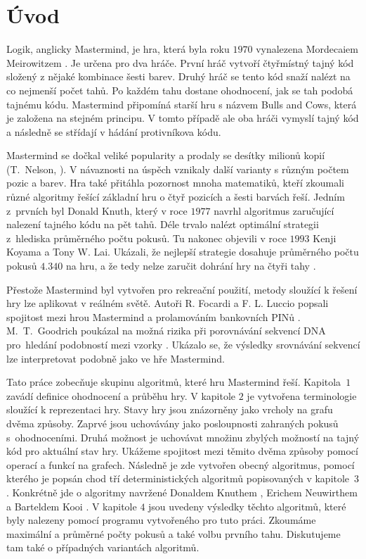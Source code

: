 \chapter*{Úvod}

Logik, anglicky Mastermind, je hra, která byla roku $1970$ vynalezena Mordecaiem Meirowitzem \cite{Nelson-history}. Je určena pro dva hráče. První hráč vytvoří čtyřmístný tajný kód složený z nějaké kombinace šesti barev. Druhý hráč se tento kód snaží nalézt na co nejmenší počet tahů. Po každém tahu dostane ohodnocení, jak se tah podobá tajnému kódu. Mastermind připomíná starší hru s názvem Bulls and Cows, která je založena na stejném principu. V tomto případě ale oba hráči vymyslí tajný kód a následně se střídají v hádání protivníkova kódu. 

Mastermind se dočkal veliké popularity a prodaly se desítky milionů kopií (T.~Nelson, \cite{Nelson-history}). V návaznosti na úspěch vznikaly další varianty s různým počtem pozic a barev. Hra také přitáhla pozornost mnoha matematiků, kteří zkoumali různé algoritmy řešící základní hru o čtyř pozicích a šesti barvách řeší. Jedním z~prvních byl Donald Knuth, který v roce $1977$ navrhl algoritmus zaručující nalezení tajného kódu na pět tahů\cite{donald_e__knuth_1977}. Déle trvalo nalézt optimální strategii z~hlediska průměrného počtu pokusů. Tu nakonec objevili v roce $1993$ Kenji Koyama a Tony W. Lai. Ukázali, že nejlepší strategie dosahuje průměrného počtu pokusů $4.340$ na hru, a že tedy nelze zaručit dohrání hry na čtyři tahy \cite{koyama}. 

Přestože Mastermind byl vytvořen pro rekreační použití, metody sloužící k řešení hry lze aplikovat v reálném světě. Autoři R. Focardi a F. L. Luccio popsali spojitost mezi hrou Mastermind a prolamováním bankovních PINů \cite{Bank-pins-Focardi}. M.~T.~Goodrich poukázal na možná rizika při porovnávání sekvencí DNA pro~hledání podobností mezi vzorky \cite{goodrich-dna}. Ukázalo se, že výsledky srovnávání sekvencí lze interpretovat podobně jako ve hře Mastermind. 


Tato práce zobecňuje skupinu algoritmů, které hru Mastermind řeší. Kapitola~$1$ zavádí definice ohodnocení a průběhu hry. V kapitole $2$ je vytvořena terminologie sloužící k reprezentaci hry. Stavy hry jsou znázorněny jako vrcholy na grafu dvěma způsoby. Zaprvé jsou uchovávány jako posloupnosti zahraných pokusů s~ohodnoceními. Druhá možnost je uchovávat množinu zbylých možností na tajný kód pro aktuální stav hry. Ukážeme spojitost mezi těmito dvěma způsoby pomocí operací a funkcí na grafech. Následně je zde vytvořen obecný algoritmus, pomocí kterého je popsán chod tří deterministických algoritmů popisovaných v kapitole~$3$. Konkrétně jde o algoritmy navržené Donaldem Knuthem \cite{donald_e__knuth_1977}, Erichem Neuwirthem \cite{neuwirth} a Barteldem Kooi \cite{kooi}. V kapitole $4$ jsou uvedeny výsledky těchto algoritmů, které byly nalezeny pomocí programu vytvořeného pro tuto práci. Zkoumáme maximální a průměrné počty pokusů a také volbu prvního tahu. Diskutujeme tam také o případných variantách algoritmů. 